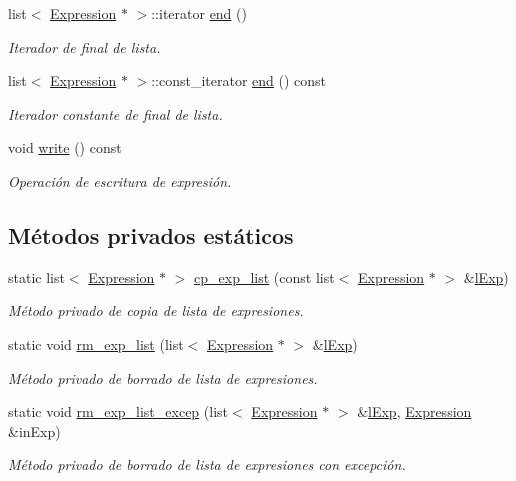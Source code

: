 \begin{DoxyCompactItemize}
list$<$ \hyperlink{class_expression}{Expression} $\ast$ $>$\+::iterator \hyperlink{class_expression_a8c467b7d380f0ed9a53f68ba7e966b9a}{end} ()
\begin{DoxyCompactList}\small\item\em Iterador de final de lista. \end{DoxyCompactList}\item 
list$<$ \hyperlink{class_expression}{Expression} $\ast$ $>$\+::const\+\_\+iterator \hyperlink{class_expression_a10245889c1ebf81ca73b72eb2c56b16b}{end} () const 
\begin{DoxyCompactList}\small\item\em Iterador constante de final de lista. \end{DoxyCompactList}\item 
void \hyperlink{class_expression_a6d5d0fa496e3713c332c9f1edc269de5}{write} () const 
\begin{DoxyCompactList}\small\item\em Operación de escritura de expresión. \end{DoxyCompactList}\end{DoxyCompactItemize}
\subsection*{Métodos privados estáticos}
\begin{DoxyCompactItemize}
\item 
static list$<$ \hyperlink{class_expression}{Expression} $\ast$ $>$ \hyperlink{class_expression_a1448971f257d469bbcef8b84d8d652c6}{cp\+\_\+exp\+\_\+list} (const list$<$ \hyperlink{class_expression}{Expression} $\ast$ $>$ \&\hyperlink{class_expression_afb4f4617291f7e182cbf2252151b122a}{l\+Exp})
\begin{DoxyCompactList}\small\item\em Método privado de copia de lista de expresiones. \end{DoxyCompactList}\item 
static void \hyperlink{class_expression_aa5d0849c114e1723ba13a6e20645c4a0}{rm\+\_\+exp\+\_\+list} (list$<$ \hyperlink{class_expression}{Expression} $\ast$ $>$ \&\hyperlink{class_expression_afb4f4617291f7e182cbf2252151b122a}{l\+Exp})
\begin{DoxyCompactList}\small\item\em Método privado de borrado de lista de expresiones. \end{DoxyCompactList}\item 
static void \hyperlink{class_expression_aaadbe1cef2a0da809eac122a66d0ce9b}{rm\+\_\+exp\+\_\+list\+\_\+excep} (list$<$ \hyperlink{class_expression}{Expression} $\ast$ $>$ \&\hyperlink{class_expression_afb4f4617291f7e182cbf2252151b122a}{l\+Exp}, \hyperlink{class_expression}{Expression} \&in\+Exp)
\begin{DoxyCompactList}\small\item\em Método privado de borrado de lista de expresiones con excepción. \end{DoxyCompactList}\end{DoxyCompactItemize}
